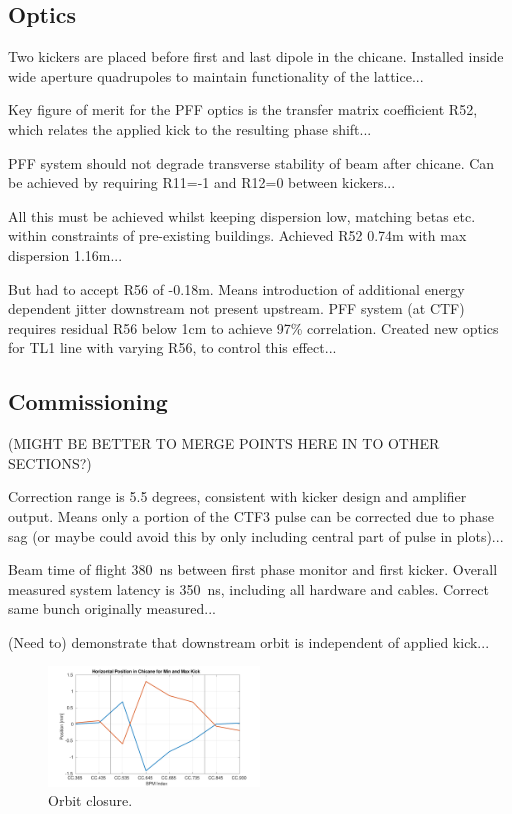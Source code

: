 \documentclass[%
 reprint,
 amsmath,amssymb,
 aps,
]{revtex4-1}
\begin{document}
\subsection{\label{ss:hardware}Optics}

Two kickers are placed before first and last dipole in the chicane. Installed inside wide aperture quadrupoles to maintain functionality of the lattice...

Key figure of merit for the PFF optics is the transfer matrix coefficient R52, which relates the applied kick to the resulting phase shift...

PFF system should not degrade transverse stability of beam after chicane. Can be achieved by requiring R11=-1 and R12=0 between kickers...

All this must be achieved whilst keeping dispersion low, matching betas etc. within constraints of pre-existing buildings. Achieved R52 0.74m with max dispersion 1.16m...

But had to accept R56 of -0.18m. Means introduction of additional energy dependent jitter downstream not present upstream. PFF system (at CTF) requires residual R56 below 1cm to achieve 97\% correlation. Created new optics for TL1 line with varying R56, to control this effect...

\subsection{\label{ss:commiss}Commissioning}

(MIGHT BE BETTER TO MERGE POINTS HERE IN TO OTHER SECTIONS?)

Correction range is 5.5 degrees, consistent with kicker design and amplifier output. Means only a portion of the CTF3 pulse can be corrected due to phase sag (or maybe could avoid this by only including central part of pulse in plots)...

Beam time of flight 380~ns between first phase monitor and first kicker. Overall measured system latency is 350~ns, including all hardware and cables. Correct same bunch originally measured...

(Need to) demonstrate that downstream orbit is independent of applied kick...

\begin{figure}
\includegraphics[width=0.5\textwidth]{figs/orbClos}%
\caption{\label{fig:orbClos}Orbit closure.}
\end{figure}
\end{document}
